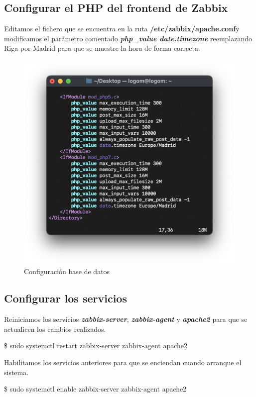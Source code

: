     \subsection{Configurar el PHP del frontend de Zabbix}
    Editamos el fichero que se encuentra en la ruta \textbf{/etc/zabbix/apache.conf}y modificamos el parámetro comentado \textbf{\emph{php\_value date.timezone}} reemplazando Riga
    por Madrid para que se muestre la hora de forma correcta.
    \begin{figure}[H]
        \centering
        \includegraphics[scale=0.5]{images/apache_conf.png}
        \caption{Configuración base de datos}
        \label{fig:apache_conf}
    \end{figure}

    \subsection{Configurar los servicios}
    Reiniciamos los servicios \textbf{\emph{zabbix-server}}, \textbf{\emph{zabbix-agent}} y \textbf{\emph{apache2}} para que se actualicen los cambios realizados.
        \begin{tcolorbox}[colback=black!10, halign=left]
            \$ sudo systemctl restart zabbix-server zabbix-agent apache2
        \end{tcolorbox}

    Habilitamos los servicios anteriores para que se enciendan cuando arranque el sistema.
        \begin{tcolorbox}[colback=black!10, halign=left]
            \$ sudo systemctl enable zabbix-server zabbix-agent apache2
        \end{tcolorbox}

